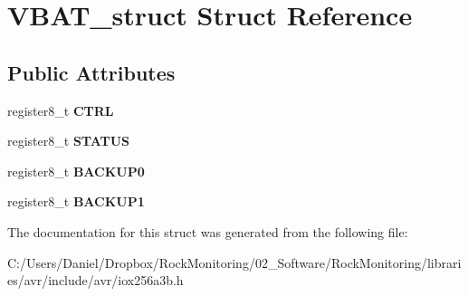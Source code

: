 \hypertarget{struct_v_b_a_t__struct}{}\section{V\+B\+A\+T\+\_\+struct Struct Reference}
\label{struct_v_b_a_t__struct}
\subsection*{Public Attributes}
\begin{DoxyCompactItemize}
\item 
register8\+\_\+t {\bfseries C\+T\+RL}\hypertarget{struct_v_b_a_t__struct_aa0e053139d6801186024f073ddd64ea8}{}\label{struct_v_b_a_t__struct_aa0e053139d6801186024f073ddd64ea8}

\item 
register8\+\_\+t {\bfseries S\+T\+A\+T\+US}\hypertarget{struct_v_b_a_t__struct_ae6e308b14aba8017228db6dae1b2079a}{}\label{struct_v_b_a_t__struct_ae6e308b14aba8017228db6dae1b2079a}

\item 
register8\+\_\+t {\bfseries B\+A\+C\+K\+U\+P0}\hypertarget{struct_v_b_a_t__struct_ada04c8c50a4ca66c598034fcb4008b2b}{}\label{struct_v_b_a_t__struct_ada04c8c50a4ca66c598034fcb4008b2b}

\item 
register8\+\_\+t {\bfseries B\+A\+C\+K\+U\+P1}\hypertarget{struct_v_b_a_t__struct_a524addba24ff211983b8db264dd528c4}{}\label{struct_v_b_a_t__struct_a524addba24ff211983b8db264dd528c4}

\end{DoxyCompactItemize}


The documentation for this struct was generated from the following file\+:\begin{DoxyCompactItemize}
\item 
C\+:/\+Users/\+Daniel/\+Dropbox/\+Rock\+Monitoring/02\+\_\+\+Software/\+Rock\+Monitoring/libraries/avr/include/avr/iox256a3b.\+h\end{DoxyCompactItemize}

